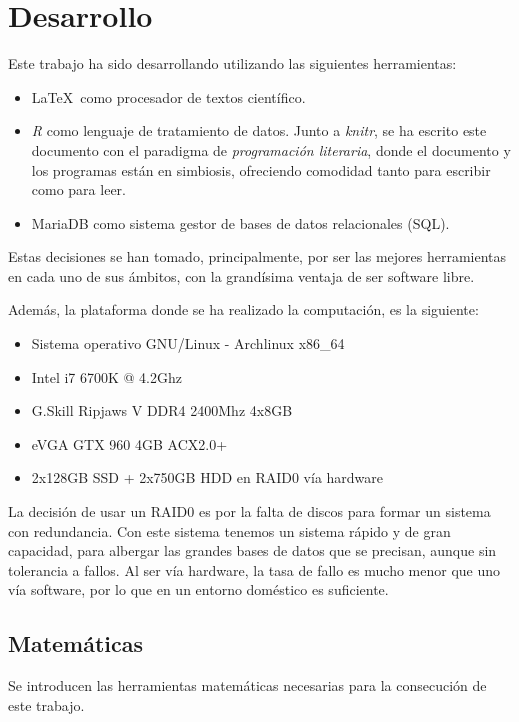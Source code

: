 \documentclass[a4paper,11pt]{book}\usepackage[]{graphicx}\usepackage[]{color}
\theoremstyle{plain}
\theoremstyle{definition}
\begin{document}
\chapter{Desarrollo}



Este trabajo ha sido desarrollando utilizando las siguientes herramientas:

\begin{itemize}
  \item \LaTeX \, como procesador de textos científico.
  \item \emph{R} como lenguaje de tratamiento de datos. Junto a \emph{knitr},
  se ha escrito este documento con el paradigma de \emph{programación literaria},
  donde el documento y los programas están en simbiosis, ofreciendo comodidad
  tanto para escribir como para leer.
  \item MariaDB como sistema gestor de bases de datos relacionales (SQL).
\end{itemize}

Estas decisiones se han tomado, principalmente, por ser las mejores herramientas
en cada uno de sus ámbitos, con la grandísima ventaja de ser software libre.

Además, la plataforma donde se ha realizado la computación, es la siguiente:
\begin{itemize}
  \item Sistema operativo GNU/Linux - Archlinux x86\_64
  \item Intel i7 6700K @ 4.2Ghz
  \item G.Skill Ripjaws V DDR4 2400Mhz 4x8GB
  \item eVGA GTX 960 4GB ACX2.0+
  \item 2x128GB SSD + 2x750GB HDD en RAID0 vía hardware
\end{itemize}

La decisión de usar un RAID0 es por la falta de discos para formar un sistema
con redundancia. Con este sistema tenemos un sistema rápido y de gran capacidad,
para albergar las grandes bases de datos que se precisan, aunque sin tolerancia
a fallos. Al ser vía hardware, la tasa de fallo es mucho menor que uno vía
software, por lo que en un entorno doméstico es suficiente.


\section{Matemáticas}

Se introducen las herramientas matemáticas necesarias para la consecución de este trabajo.
\end{document}
